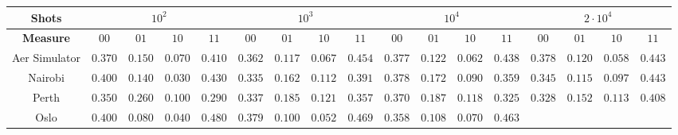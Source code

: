 \begin{table}
\begin{tabular}{c|cccc|cccc|cccc|cccc}
\toprule
\textbf{Shots}  & \multicolumn{4}{c|}{$\scriptstyle10^2$} 
                & \multicolumn{4}{c|}{$\scriptstyle10^3$} 
                & \multicolumn{4}{c|}{$\scriptstyle10^4$} 
                & \multicolumn{4}{c}{$\scriptstyle2\cdot 10^4$}\\
\midrule
\textbf{Measure}    & $\scriptstyle00$ & $\scriptstyle01$ & $\scriptstyle10$ & $\scriptstyle11$
                    & $\scriptstyle00$ & $\scriptstyle01$ & $\scriptstyle10$ & $\scriptstyle11$
                    & $\scriptstyle00$ & $\scriptstyle01$ & $\scriptstyle10$ & $\scriptstyle11$
                    & $\scriptstyle00$ & $\scriptstyle01$ & $\scriptstyle10$ & $\scriptstyle11$\\
\midrule
Aer Simulator   & $\scriptstyle0.370$ & $\scriptstyle0.150$ & $\scriptstyle0.070$ & $\scriptstyle0.410$ 
                & $\scriptstyle0.362$ & $\scriptstyle0.117$ & $\scriptstyle0.067$ & $\scriptstyle0.454$ 
                & $\scriptstyle0.377$ & $\scriptstyle0.122$ & $\scriptstyle0.062$ & $\scriptstyle0.438$ 
                & $\scriptstyle0.378$ & $\scriptstyle0.120$ & $\scriptstyle0.058$ & $\scriptstyle0.443$\\                
Nairobi         & $\scriptstyle0.400$ & $\scriptstyle0.140$ & $\scriptstyle0.030$ & $\scriptstyle0.430$ 
                & $\scriptstyle0.335$ & $\scriptstyle0.162$ & $\scriptstyle0.112$ & $\scriptstyle0.391$ 
                & $\scriptstyle0.378$ & $\scriptstyle0.172$ & $\scriptstyle0.090$ & $\scriptstyle0.359$
                & $\scriptstyle0.345$ & $\scriptstyle0.115$ & $\scriptstyle0.097$ & $\scriptstyle0.443$\\               
Perth           & $\scriptstyle0.350$ & $\scriptstyle0.260$ & $\scriptstyle0.100$ & $\scriptstyle0.290$ 
                & $\scriptstyle0.337$ & $\scriptstyle0.185$ & $\scriptstyle0.121$ & $\scriptstyle0.357$ 
                & $\scriptstyle0.370$ & $\scriptstyle0.187$ & $\scriptstyle0.118$ & $\scriptstyle0.325$
                & $\scriptstyle0.328$ & $\scriptstyle0.152$ & $\scriptstyle0.113$ & $\scriptstyle0.408$\\
Oslo            & $\scriptstyle0.400$ & $\scriptstyle0.080$ & $\scriptstyle0.040$ & $\scriptstyle0.480$ 
                & $\scriptstyle0.379$ & $\scriptstyle0.100$ & $\scriptstyle0.052$ & $\scriptstyle0.469$ 
                & $\scriptstyle0.358$ & $\scriptstyle0.108$ & $\scriptstyle0.070$ & $\scriptstyle0.463$

\end{tabular}
\end{table}
